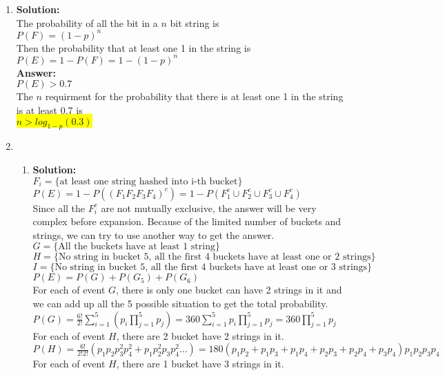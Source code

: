 \documentclass{article}
\newcommand{\myansw}{\textbf{Answer:}\\}
\newcommand{\mysolu}{\textbf{Solution:}\\}
\begin{document}
\begin{enumerate}
\begin{enumerate}
	\end{enumerate}
	\item
	\mysolu
	The probability of all the bit in a ${n}$ bit string is\\
	${P(F) = (1-p)^n}$\\
	Then the probability that at least one 1 in the string is\\
	${P(E) = 1- P(F)= 1-(1-p)^n}$\\
	\myansw
	${P(E)>0.7}$\\
	The ${n}$ requirment for the probability that there is at least one 1 in the string is at least 0.7 is\\
	\colorbox{yellow}{	
		${n>log_{1-p}(0.3)}$
	}\\
	\item
	\begin{enumerate}
		\item
		\mysolu
		${F_i=\{\text{at least one string hashed into i-th bucket}\}}$\\
		${P(E) = 1-P((F_1 F_2 F_3 F_4)^c)=1-P(F_1^c \cup F_2^c \cup F_3^c \cup F_4^c)}$\\
		Since all the ${F_i^c}$ are not mutually exclusive, the answer will be very complex before expansion.
		Because of the limited number of buckets and strings, we can try to use another way to get the answer.\\
		${G = \{\text{All the buckets have at least 1 string}\}}$\\
		${H = \{\text{No string in bucket 5, all the first 4 buckets have at least one or 2 strings}\}}$\\
		${I = \{\text{No string in bucket 5, all the first 4 buckets have at least one or 3 strings}\}}$\\
		${P(E)=P(G)+P(G_5)+P(G_6)}$\\
		For each of event ${G}$, there is only one bucket can have 2 strings in it and we can add up all the 5 possible situation to get the total probability.\\
		${P(G)=\frac{6!}{2!}\sum\limits_{i=1}^5(p_i\prod\limits_{j=1}^5p_j)=360\sum\limits_{i=1}^5 p_i\prod\limits_{j=1}^5p_j = 360\prod\limits_{j=1}^5p_j}$\\
		For each of event ${H}$, there are 2 bucket have 2 strings in it.\\
		${P(H)=\frac{6!}{2!2!}(p_1 p_2 p_3^2 p_4^2+p_1 p_2^2 p_3 p_4^2 \ldots)=180(p_1 p_2 + p_1 p_3 + p_1 p_4 + p_2 p_3 + p_2 p_4 + p_3 p_4)p_1 p_2 p_3 p_4}$\\
		For each of event ${H}$, there are 1 bucket have 3 strings in it.\\

\end{enumerate}
\end{enumerate}
\end{document}

